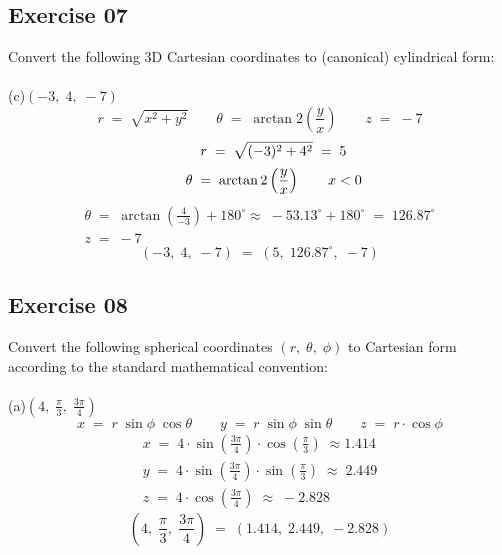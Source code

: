 \documentclass[12pt, a4paper]{article}
\begin{document}
\subsection*{Exercise 07}
Convert the following 3D Cartesian coordinates to
(canonical) cylindrical form:\\\\
	(c)\quad$(-3,\;4,\;-7)$
		\begin{equation}
			\tag*{}
				r\;=\;\sqrt{x^2+y^2}\qquad
				\theta\;=\;\arctan2\left(\frac{y}{x}\right)
				\qquad z\;=\;-7
		\end{equation}
		\begin{equation}
			\tag*{}
				r\;=\;\sqrt{(-3)^2+4^2}\;=\;5\\
		\end{equation}
		\begin{equation}
			\tag*{}
				\theta\;=\; \arctan2\left(\frac{y}{x}\right)
				\qquad x < 0\\
		\end{equation}
		\begin{gather}
			\tag*{}
				\theta\;=\;\arctan\left(\frac{4}{-3}\right)
				+180^\circ
				\approx\;-53.13^\circ+180^\circ
				\;=\;126.87^\circ\\
			\tag*{}
				z\;=\;-7
		\end{gather}
		\begin{equation}
			\tag*{}
				(-3,\;4,\;-7)\;=\;(5,\;126.87^\circ,\;-7)
		\end{equation}
		
\subsection*{Exercise 08}
Convert the following spherical coordinates
$(r,\;\theta,\;\phi)$ to Cartesian form according to the standard mathematical convention:\\\\
	(a)\quad$\left(4,\;\frac{\pi}{3},\;\frac{3\pi}{4}\right)$
		\begin{equation}
			\tag*{}
				x\;=\;r\;\sin\phi\;\cos\theta\qquad
				y\;=\;r\;\sin\phi\;\sin\theta\qquad
				z\;=\;r\cdot\cos\phi
		\end{equation}
		\begin{gather}
			\tag*{}
				x\;=\;4\cdot\sin\left(\frac{3\pi}{4}\right)\cdot
					\cos\left(\frac{\pi}{3}\right)
					\;\approx1.414\\
			\tag*{}
				y\;=\;4\cdot\sin\left(\frac{3\pi}{4}\right)\cdot
					\sin\left(\frac{\pi}{3}\right)
					\;\approx\;2.449\\
			\tag*{}
				z\;=\;4\cdot\cos\left(\frac{3\pi}{4}\right)
				\;\approx\;-2.828
		\end{gather}
		\begin{equation}
			\tag*{}
				\left(4,\;\frac{\pi}{3},\;\frac{3\pi}{4}\right)
				\;=\;(1.414,\;2.449,\;-2.828)
		\end{equation}
\end{document}
